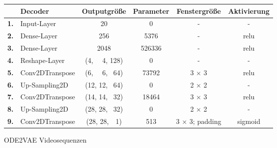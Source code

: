 \documentclass[12pt]{article}
\begin{document}
	\begin{table}[htb]
		\begin{center}
			\begin{tabular}{llcccc}\toprule
				\textbf{\ }	&\textbf{Decoder}	&\textbf{Outputgröße} &\textbf{Parameter} &\textbf{Fenstergröße} &\textbf{Aktivierung}\\
				\midrule
				\textbf{1.}	&Input-Layer	& 20		& 0		& - 			&- \\
				\textbf{2.}	&Dense-Layer 			& 256		& 5376	& -				&relu \\
				\textbf{3.}	&Dense-Layer			& 2048		& 526336& -				&relu \\
				\textbf{4.}	&Reshape-Layer		& (4, \ \ 4,  128)	& 0		& -		&- \\
				\textbf{5.}	&Conv2DTranspose& (6, \ \ 6, \ 64)	& 73792	& 3 $\times$ 3 	&relu \\
				\textbf{6.}	&Up-Sampling2D	& (12, 12, \ 64)	& 0		& 2 $\times$ 2 	&- \\
				\textbf{7.}	&Conv2DTranspose& (14, 14, \ 32)	& 18464		& 3 $\times$ 3 			&relu \\
				\textbf{8.}	&Up-Sampling2D	& (28, 28, \ 32)	& 0	& 2 $\times$ 2 			&- \\
				\textbf{9.}	&Conv2DTranspose& (28, 28,\ \ 1)	& 513  	& 3 $\times$ 3; padding 			&sigmoid \\
				\bottomrule
			\end{tabular}
		\end{center}
	\end{table}
	\noindent
	\newpage
	ODE2VAE Videosequenzen
\end{document}
